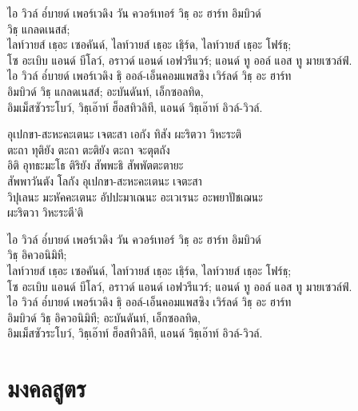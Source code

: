 \begin{english}
\begin{english}
ไอ วิวล์ อ๎บายด์ เพอร์เวดิง วัน ควอร์เทอร์ วิธฺ อะ ฮาร์ท อิมบิวด์\\
	\vin วิธฺ แกลดเนสส์;\\
ไลท์วายส์ เธฺอะ เซอคันด์, ไลท์วายส์ เธฺอะ เธฺิร์ด, ไลท์วายส์ เธฺอะ โฟร์ธฺ;\\
โซ อะเบิบ แอนด์ บีโลว์, อราวด์ แอนด์ เอฟวรีแวร์; แอนด์ ทู ออล์ แอส ทู มายเซวล์ฟ์.\\
ไอ วิวล์ อ๎บายด์ เพอร์เวดิง ธฺิ ออล์-เอ็นคอมแพสซิง เวิร์ลด์ วิธฺ อะ ฮาร์ท\\
	\vin อิมบิวด์ วิธฺ แกลดเนสส์; อะบันดันท์, เอ็กซอลทิด,\\
	\vin อิมเม็สซัวระโบว์, วิธฺเอ๊าท์ ฮ็อสทิวลิที, แอนด์ วิธฺเอ๊าท์ อิวล์-วิวล์.
\end{english}

อุเปกขา-สะหะคะเตนะ เจตะสา เอกัง ทิสัง ผะริตวา วิหะระติ\\
ตะถา ทุติยัง ตะถา ตะติยัง ตะถา จะตุตถัง\\
อิติ อุทธะมะโธ ติริยัง สัพพะธิ สัพพัตตะตายะ\\
สัพพาวันตัง โลกัง อุเปกขา-สะหะคะเตนะ เจตะสา\\
วิปุเลนะ มะหัคคะเตนะ อัปปะมาเณนะ อะเวเรนะ อะพยาปัชเฌนะ\\
    \vin ผะริตวา วิหะระตี’ติ

\begin{english}
ไอ วิวล์ อ๎บายด์ เพอร์เวดิง วัน ควอร์เทอร์ วิธฺ อะ ฮาร์ท อิมบิวด์\\
	\vin วิธฺ อิควอนิมิที;\\
ไลท์วายส์ เธฺอะ เซอคันด์, ไลท์วายส์ เธฺอะ เธฺิร์ด, ไลท์วายส์ เธฺอะ โฟร์ธฺ;\\
โซ อะเบิบ แอนด์ บีโลว์, อราวด์ แอนด์ เอฟวรีแวร์; แอนด์ ทู ออล์ แอส ทู มายเซวล์ฟ์.\\
ไอ วิวล์ อ๎บายด์ เพอร์เวดิง ธฺิ ออล์-เอ็นคอมแพสซิง เวิร์ลด์ วิธฺ อะ ฮาร์ท\\
    \vin อิมบิวด์ วิธฺ อิควอนิมิที; อะบันดันท์, เอ็กซอลทิด,\\
    \vin อิมเม็สซัวระโบว์, วิธฺเอ๊าท์ ฮ็อสทิวลิที, แอนด์ วิธฺเอ๊าท์ อิวล์-วิวล์.
\end{english}

\chapter{มงคลสูตร}


\begin{leader}
\end{leader}


\end{english}
